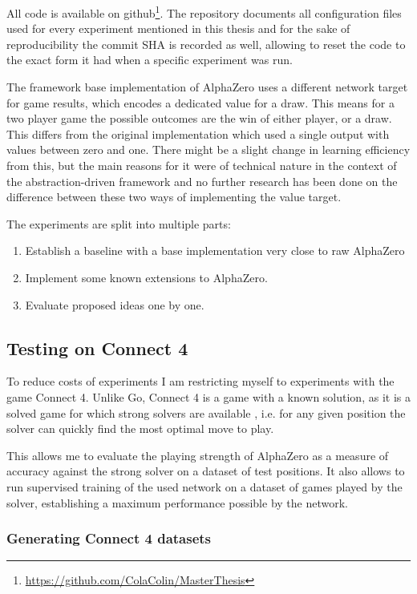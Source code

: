\documentclass[12pt,onecolumn,oneside,titlepage]{article}
\begin{document}
All code is available on github\footnote{\url{https://github.com/ColaColin/MasterThesis}}. The repository documents all configuration files used for every experiment mentioned in this thesis and 
for the sake of reproducibility the commit SHA is recorded as well, allowing to reset the code to the exact form it had when a specific experiment was run.

The framework base implementation of AlphaZero uses a different network target for game results, which encodes a dedicated value for a draw. This means for a two player game the possible outcomes are the win of either player, or a draw.
This differs from the original implementation which used a single output with values between zero and one.
There might be a slight change in learning efficiency from this, but the main reasons for it were of technical nature in the context of the abstraction-driven framework and no further research has been done on the difference between these two ways of implementing the value target.

The experiments are split into multiple parts:
\begin{enumerate}
 \item Establish a baseline with a base implementation very close to raw AlphaZero
 \item Implement some known extensions to AlphaZero.
 \item Evaluate proposed ideas one by one.
\end{enumerate}

\subsection{Testing on Connect 4}

To reduce costs of experiments I am restricting myself to experiments with the game Connect 4. Unlike Go, Connect 4 is a game with a known solution, as it is a solved game for which strong solvers are available \cite{trompsolved, pascalsolver, pascalsolvergithub}, 
i.e. for any given position the solver can quickly find the most optimal move to play.

This allows me to evaluate the playing strength of AlphaZero as a measure of accuracy against the strong solver on a dataset of test positions.
It also allows to run supervised training of the used network on a dataset of games played by the solver, establishing a maximum performance possible by the network.

\subsubsection{Generating Connect 4 datasets}
\label{s:generate_dataset}
\end{document}
